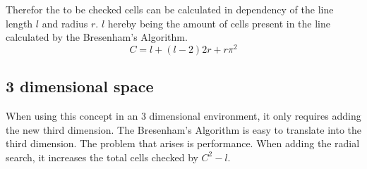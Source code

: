 Therefor the to be checked cells can be calculated in dependency of the line length $l$ and radius $r$. $l$ hereby being the amount of cells present in the line calculated by the Bresenham's Algorithm. 
\[C=l+(l-2)2r+r\pi^2\]

\subsection{3 dimensional space}
When using this concept in an 3 dimensional environment, it only requires adding the new third dimension. The Bresenham's Algorithm is easy to translate into the third dimension. The problem that arises is performance. When adding the radial search, it increases the total cells checked by \(C^2 - l\).  
